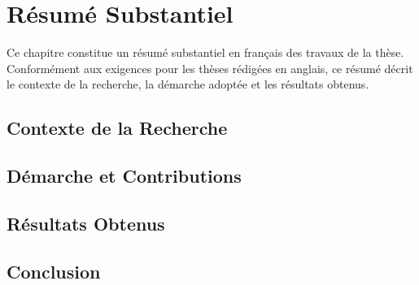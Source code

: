 \chapter{Résumé Substantiel}
\label{app:french_summary}

Ce chapitre constitue un résumé substantiel en français des travaux de la thèse.
Conformément aux exigences pour les thèses rédigées en anglais, ce résumé décrit le contexte de la recherche, la démarche adoptée et les résultats obtenus.

\section{Contexte de la Recherche}
\section{Démarche et Contributions}
\section{Résultats Obtenus}
\section{Conclusion}
